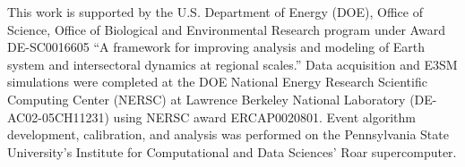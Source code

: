 \documentclass[nhess, manuscript]{copernicus}
\begin{document}
%
%
%
%
%
%
%
%




\begin{acknowledgements}
This work is supported by the U.S. Department of Energy (DOE), Office of Science, Office of Biological and Environmental Research program under Award DE-SC0016605 ``A framework for improving analysis and modeling of Earth system and intersectoral dynamics at regional scales.'' Data acquisition and E3SM simulations were completed at the DOE National Energy Research Scientific Computing Center (NERSC) at Lawrence Berkeley National Laboratory (DE-AC02-05CH11231) using NERSC award ERCAP0020801. Event algorithm development, calibration, and analysis was performed on the Pennsylvania State University's Institute for Computational and Data Sciences' Roar supercomputer.
\end{acknowledgements}


%
%
\end{document}
